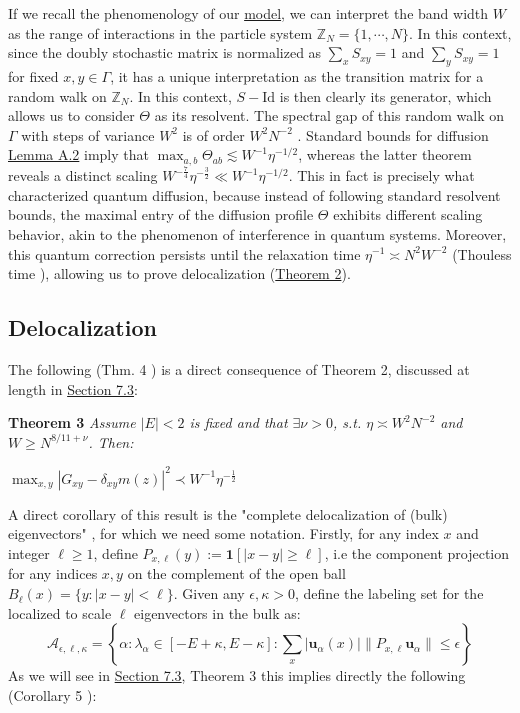 \documentclass[11pt]{article}
\newenvironment{boxtheorem}[1]
  {\begin{mdframed}\noindent\textbf{#1}\itshape\space}
  {\end{mdframed}}
\newcommand{\Z}{\mathbb{Z}}
\begin{document}
If we recall the phenomenology of our \hyperref[model]{model}, we can interpret the band width $W$ as the range of interactions in the particle system $\Z_N = \{1, \cdots, N\}$. In this context, since the doubly stochastic matrix is normalized as $\sum_x S_{xy}=1$ and $\sum_y S_{xy}=1$ for fixed $x, y\in \Gamma$, it has a unique interpretation as the transition matrix for a random walk on $\Z_N$. In this context, $S-\text{Id}$ is then clearly its generator, which allows us to consider $\Theta$ as its resolvent. The spectral gap of this random walk on $\Gamma$ with steps of variance $W^2$ is of order $W^2N^{-2}$ \cite{bandSDE}. Standard bounds for diffusion \hyperref[lemma-a2]{Lemma A.2} imply that $\max_{a,b}\Theta_{ab} \lesssim W^{-1}\eta^{-1/2}$, whereas the latter theorem reveals a distinct scaling  $W^{-\frac{7}{4}}\eta^{-\frac{3}{2}}\ll W^{-1}\eta^{-1/2}$. This in fact is precisely what characterized quantum diffusion, because instead of following standard resolvent bounds, the maximal entry of the diffusion profile $\Theta$ exhibits different scaling behavior, akin to the phenomenon of interference in quantum systems. Moreover, this quantum correction persists until the relaxation time $\eta^{-1}\asymp N^2W^{-2}$ (Thouless time \cite{17, 32, 33}), allowing us to prove delocalization (\hyperref[proof-deloc]{Theorem 2}).

\subsection{Delocalization}
The following (Thm. 4 \cite{bandSDE}) is a direct consequence of Theorem 2, discussed at length in \hyperref[proof-deloc]{Section 7.3}:

\begin{boxtheorem}{Theorem 3}
\noindent Assume $|E|<2$ is fixed and that $\exists \nu>0$, s.t. $\eta \asymp W^2 N^{-2}$ and $W\geq N^{8/11+\nu}$. Then:
\begin{center}$\max_{x, y}|G_{xy} - \delta_{xy}m(z)|^2\prec W^{-1}\eta^{-\frac{1}{2}}$\end{center}
\end{boxtheorem}

\noindent A direct corollary of this result is the "complete delocalization of (bulk) eigenvectors" \cite{bandSDE, 21}, for which we need some notation. Firstly, for any index $x$ and integer $\ell\geq 1$,  define $P_{x, \ell}(y):=\mathbf{1}[|x-y|\geq \ell]$, i.e the component projection for any indices $x, y$ on the complement of the open ball $B_\ell(x) = \{y:|x-y|<\ell \}$. Given any $\epsilon, \kappa>0$, define the labeling set for the localized to scale $\ell$ eigenvectors in the bulk as: $$\mathcal{A}_{\epsilon, \ell, \kappa} = \left\{\alpha: \lambda_\alpha \in [-E+\kappa, E-\kappa]: \sum_x |\mathbf{u}_\alpha(x)|\|P_{x, \ell}\mathbf{u}_\alpha\|\leq \epsilon\right\}$$
As we will see in \hyperref[proof-deloc]{Section 7.3}, Theorem 3 this implies directly the following (Corollary 5 \cite{bandSDE}): 
\end{document}
